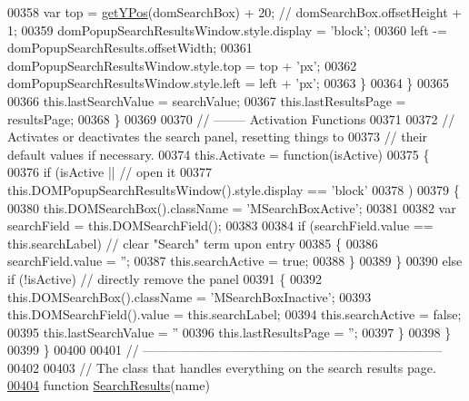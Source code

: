 \begin{DoxyCode}
00358          var top  = \hyperlink{search_8js_a8d7b405228661d7b6216b6925d2b8a69}{getYPos}(domSearchBox) + 20;  \textcolor{comment}{// domSearchBox.offsetHeight + 1;}
00359          domPopupSearchResultsWindow.style.display = \textcolor{stringliteral}{'block'};
00360          left -= domPopupSearchResults.offsetWidth;
00361          domPopupSearchResultsWindow.style.top     = top  + \textcolor{stringliteral}{'px'};
00362          domPopupSearchResultsWindow.style.left    = left + \textcolor{stringliteral}{'px'};
00363        \}
00364     \}
00365 
00366     this.lastSearchValue = searchValue;
00367     this.lastResultsPage = resultsPage;
00368   \}
00369 
00370   \textcolor{comment}{// -------- Activation Functions}
00371 
00372   \textcolor{comment}{// Activates or deactivates the search panel, resetting things to}
00373   \textcolor{comment}{// their default values if necessary.}
00374   this.Activate = \textcolor{keyword}{function}(isActive)
00375   \{
00376     \textcolor{keywordflow}{if} (isActive || \textcolor{comment}{// open it}
00377         this.DOMPopupSearchResultsWindow().style.display == \textcolor{stringliteral}{'block'}
00378        )
00379     \{
00380       this.DOMSearchBox().className = \textcolor{stringliteral}{'MSearchBoxActive'};
00381 
00382       var searchField = this.DOMSearchField();
00383 
00384       \textcolor{keywordflow}{if} (searchField.value == \textcolor{keyword}{this}.searchLabel) \textcolor{comment}{// clear "Search" term upon entry}
00385       \{
00386         searchField.value = \textcolor{stringliteral}{''};
00387         this.searchActive = \textcolor{keyword}{true};
00388       \}
00389     \}
00390     \textcolor{keywordflow}{else} \textcolor{keywordflow}{if} (!isActive) \textcolor{comment}{// directly remove the panel}
00391     \{
00392       this.DOMSearchBox().className = \textcolor{stringliteral}{'MSearchBoxInactive'};
00393       this.DOMSearchField().value   = this.searchLabel;
00394       this.searchActive             = \textcolor{keyword}{false};
00395       this.lastSearchValue          = \textcolor{stringliteral}{''}
00396       this.lastResultsPage          = \textcolor{stringliteral}{''};
00397     \}
00398   \}
00399 \}
00400 
00401 \textcolor{comment}{// -----------------------------------------------------------------------}
00402 
00403 \textcolor{comment}{// The class that handles everything on the search results page.}
\hypertarget{search_8js_source.tex_l00404}{}\hyperlink{search_8js_a9189b9f7a32b6bc78240f40348f7fe03}{00404} \textcolor{keyword}{function} \hyperlink{search_8js_a9189b9f7a32b6bc78240f40348f7fe03}{SearchResults}(name)

\end{DoxyCode}

